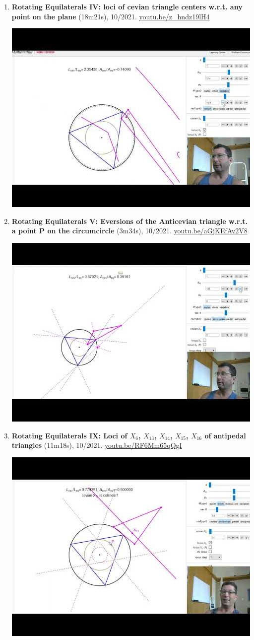 \documentclass[12pt]{article}
\begin{document}
\begin{enumerate}[resume]
% 
\item \textbf{Rotating Equilaterals IV: loci of cevian triangle centers w.r.t. any point on the plane} (18m21s), 10/2021. \href{https://youtu.be/z_hndz19lH4}{\url{youtu.be/z\_hndz19lH4}}
\begin{center}\includegraphics[width=.5\textwidth]{pics/z_hndz19lH4.jpg}\end{center}
% 
\item \textbf{Rotating Equilaterals V: Eversions of the Anticevian triangle w.r.t. a point P on the circumcircle} (3m34s), 10/2021. \href{https://youtu.be/aGjKEfAv2V8}{\url{youtu.be/aGjKEfAv2V8}}
\begin{center}\includegraphics[width=.5\textwidth]{pics/aGjKEfAv2V8.jpg}\end{center}
% 
\item \textbf{Rotating Equilaterals IX: Loci of $X_{6}$, $X_{13}$, $X_{14}$, $X_{15}$, $X_{16}$ of antipedal triangles} (11m18s), 10/2021. \href{https://youtu.be/RF6Mm65qQgI}{\url{youtu.be/RF6Mm65qQgI}}
\begin{center}\includegraphics[width=.5\textwidth]{pics/RF6Mm65qQgI.jpg}\end{center}

\end{enumerate}
\end{document}

